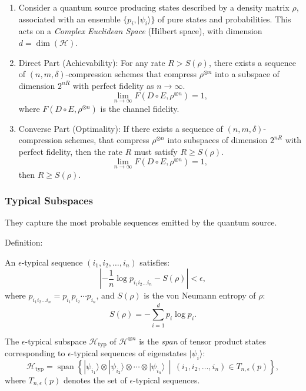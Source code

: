 \begin{enumerate}

\item Consider a quantum source producing states described by a density matrix \(\rho\), associated with an ensemble \(\{p_i, |\psi_i\rangle\}\) of pure states and probabilities. This acts on a \textit{Complex Euclidean Space} (Hilbert space), with dimension \(d = \dim(\mathcal{H})\). 

\item Direct Part (Achievability): For any rate \(R > S(\rho)\), there exists a sequence of \((n, m, \delta)\)-compression schemes that compress \(\rho^{\otimes n}\) into a subspace of dimension \(2^{nR}\) with perfect fidelity as \(n \to \infty\).
\[
\lim_{n \to \infty} F(D \circ E, \rho^{\otimes n}) = 1,
\]
where \(F(D \circ E, \rho^{\otimes n})\) is the channel fidelity.

\item Converse Part (Optimality): If there exists a sequence of \((n, m, \delta)\)-compression schemes, that compress \(\rho^{\otimes n}\) into subspaces of dimension \(2^{nR}\) with perfect fidelity, then the rate \(R\) must satisfy \(R \geq S(\rho)\).
\[
\lim_{n \to \infty} F(D \circ E, \rho^{\otimes n}) = 1,
\]
then \(R \geq S(\rho)\).

\end{enumerate}

\subsubsection{Typical Subspaces}
They capture the most probable sequences emitted by the quantum source.

Definition:

An \(\epsilon\)-typical sequence \((i_1, i_2, \dots, i_n)\) satisfies:
\[
\left| -\frac{1}{n} \log p_{i_1 i_2 \dots i_n} - S(\rho) \right| < \epsilon,
\]
where \(p_{i_1 i_2 \dots i_n} = p_{i_1} p_{i_2} \cdots p_{i_n}\), and \(S(\rho)\) is the von Neumann entropy of \(\rho\):
\[
S(\rho) = - \sum_{i=1}^d p_i \log p_i.
\]

The \(\epsilon\)-typical subspace \(\mathcal{H}_{\text{typ}}\) of \(\mathcal{H}^{\otimes n}\) is the \textit{span} of tensor product states corresponding to \(\epsilon\)-typical sequences of eigenstates \(|\psi_i\rangle\):
\[
\mathcal{H}_{\text{typ}} = \operatorname{span}\left\{ |\psi_{i_1}\rangle \otimes |\psi_{i_2}\rangle \otimes \cdots \otimes |\psi_{i_n}\rangle \, \middle| \, (i_1, i_2, \dots, i_n) \in T_{n, \epsilon}(p) \right\},
\]
where \(T_{n, \epsilon}(p)\) denotes the set of \(\epsilon\)-typical sequences.

